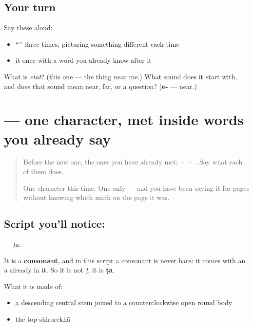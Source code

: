 \subsection*{Your turn}
Say these aloud:

\begin{itemize}
\raggedright
  \item \textquotedblleft{}\textquotedblright{} three times, picturing something different each time
  \item it once with a word you already know after it
\end{itemize}

\begin{tcolorbox}[breakable,colback=teal!4,colframe=teal!35!black,title={Before you move on}]
What is \emph{etat}? (this one — the thing near me.) What sound does it start with, and does that sound mean near, far, or a question? (\textbf{e-} — near.)
\end{tcolorbox}
\section[\texorpdfstring{\sk{ट} (ṭa)}{ट (ṭa)}]{ — one character, met inside words you already say}

\label{lesson:SA-S116-letter-tta}



\begin{quote}
Before the new one, the ones you have already met:  ·  · . Say what each of them does.

One character this time. One only — and you have been saying it for pages without knowing which mark on the page it was.
\end{quote}

\subsection*{Script you'll notice: }
\textbf{} — \emph{ṭa}.

It is a \textbf{consonant}, and in this script a consonant is never bare: it comes with an \emph{a} already in it. So it is not \emph{ṭ}, it is \textbf{ṭa}.

What it is made of:

\begin{itemize}
\raggedright
  \item a descending central stem joined to a counterclockwise open round body
  \item the top shirorekhā
\end{itemize}

